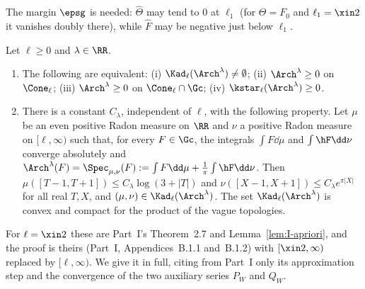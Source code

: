 The margin $\eps\mathsf g$ is needed: $\widehat\Theta$ may tend to $0$ at $\ell_1$ (for $\Theta=F_0$ and $\ell_1=\xin2$ it vanishes doubly there), while
$\widehat F$ may be negative just below $\ell_1$.

\begin{proposition}\label{prop:gap-duality}
Let $\ell\ge0$ and $\lambda\in\RR$.
\begin{enumerate}[label=\textup{(\alph*)}]
\item The following are equivalent: \textup{(i)} $\Kad_\ell(\Arch^\lambda)\ne\emptyset$; \textup{(ii)} $\Arch^\lambda\ge0$ on $\Cone_\ell$;
\textup{(iii)} $\Arch^\lambda\ge0$ on $\Cone_\ell\cap\Gc$; \textup{(iv)} $\kstar_\ell(\Arch^\lambda)\ge0$.
\item There is a constant $C_\lambda$, independent of $\ell$, with the following property. Let $\mu$ be an even positive Radon measure on $\RR$ and
$\nu$ a positive Radon measure on $[\ell,\infty)$ such that, for every $F\in\Gc$, the integrals $\int F\dd\mu$ and $\int\hF\dd\nu$ converge absolutely and
$\Arch^\lambda(F)=\Spec_{\mu,\nu}(F):=\int F\dd\mu+\frac1\pi\int\hF\dd\nu$. Then $\mu([T-1,T+1])\le C_\lambda\log(3+|T|)$ and
$\nu([X-1,X+1])\le C_\lambda e^{\pi|X|}$ for all real $T,X$, and $(\mu,\nu)\in\Kad_\ell(\Arch^\lambda)$. The set $\Kad_\ell(\Arch^\lambda)$ is convex and
compact for the product of the vague topologies.
\end{enumerate}
\end{proposition}

For $\ell=\xin2$ these are Part~I's Theorem~2.7 and Lemma~\ref{lem:I-apriori}, and the proof is theirs (Part~I, Appendices~B.1.1 and~B.1.2)
with $[\xin2,\infty)$ replaced by $[\ell,\infty)$. We give it in full, citing from Part~I only its approximation step and the convergence of the
two auxiliary series $P_W$ and $Q_W$.

